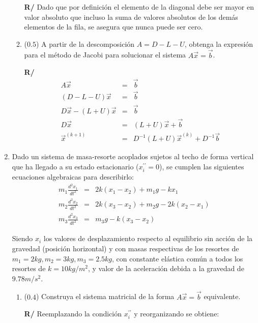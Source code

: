 \documentclass[12pt]{article}
\newcommand{\diff}[3]{\frac{d^{#3} #1}{d#2^{#3}}}
\begin{document}
\begin{enumerate}[leftmargin=*,widest=9]
\begin{enumerate}[label=\alph*]
   \textbf{R/} Dado que por definición el elemento de la diagonal debe ser mayor en valor absoluto que incluso la suma de valores absolutos de los demás elementos de la fila, se asegura que nunca puede ser cero.
   
    \item (\(0.5\)) A partir de la descomposición \(A = D -L -U\), obtenga la expresión para el método de Jacobi para solucionar el sistema \(A\vec{x} = \vec{b}\).
   
   \textbf{R/}
   \begin{eqnarray*}
   A\vec{x} &=& \vec{b} \\
   (D -L -U)\vec{x} &=& \vec{b} \\
   D\vec{x} - (L+U)\vec{x} &=& \vec{b} \\
   D\vec{x} &=& (L+U)\vec{x} + \vec{b} \\
   \vec{x}^{(k+1)} &=& D^{-1}(L+U)\vec{x}^{(k)} + D^{-1}\vec{b}
   \end{eqnarray*}
   
    \end{enumerate}
        
   \item Dado un sistema de masa-resorte acoplados sujetos al techo de forma vertical que ha llegado a su estado estacionario (\(x_i^{\prime\prime} = 0\)), se cumplen las siguientes ecuaciones algebraicas para describirlo:
   \begin{eqnarray*}
   m_1 \diff{x_1}{t}{2} &=& 2k(x_1-x_2)+m_1g -kx_1 \\
   m_2 \diff{x_2}{t}{2} &=& 2k(x_3-x_2)+m_2g -2k(x_2 - x_1)  \\
   m_3 \diff{x_3}{t}{2} &=& m_3g -k(x_3-x_2)
   \end{eqnarray*}
   
   Siendo \(x_i\) los valores de desplazamiento respecto al equilibrio sin acción de la gravedad (posición horizontal) y con masas respectivas de los resortes de \(m_1 = 2kg, m_2=3kg, m_3=2.5kg\), con constante elástica común a todos los resortes de \(k= 10kg/m^2\), y valor de la aceleración debida a la gravedad de \(9.78m/s^2\).
   \begin{enumerate}[label=\alph*]
    \item (\(0.4\)) Construya el sistema matricial de la forma \(A\vec{x} = \vec{b}\) equivalente.
    
    \textbf{R/} Reemplazando la condición \(x_i^{\prime\prime}\) y reorganizando se obtiene:
    

\end{enumerate}
\end{enumerate}
\end{document}
